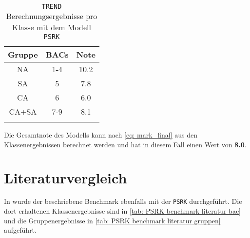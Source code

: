 \documentclass[../thesis.tex]{subfiles}
\begin{document}
\begin{table} [htb]
	\centering
	\caption{\texttt{TREND} Berechnungsergebnisse pro Klasse mit dem Modell \texttt{PSRK}}
	\begin{tabular}{ ccc }
		\hline
		Gruppe & BACs & Note  \\
		\hline
		NA & 1-4 & 10.2 \\
		SA & 5   & 7.8 \\
		CA & 6   & 6.0 \\
		CA+SA & 7-9 & 8.1 \\ 
	
		\hline
		\label{tab: meine_gesamt_ergebnisse}
	\end{tabular}
\end{table}

Die Gesamtnote des Modells kann nach \autoref{eq: mark_final} aus den Klassenergebnissen berechnet werden und hat in diesem Fall einen Wert von \textbf{8.0}.

\section{Literaturvergleich}

In \cite{bibid} wurde der beschriebene Benchmark ebenfalls mit der \texttt{PSRK} durchgeführt. Die dort erhaltenen Klassenergebnisse sind in \autoref{tab: PSRK benchmark literatur bac} und die Gruppenergebnisse in \autoref{tab: PSRK benchmark literatur gruppen} aufgeführt.
\end{document}
